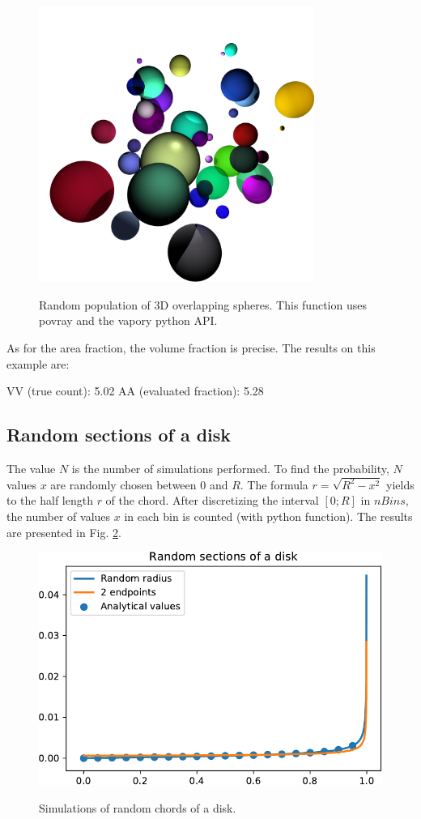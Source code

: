 \begin{figure}[htbp]
 \centering\caption{Random population of 3D overlapping spheres. This function uses povray and the vapory python API.}%
 \includegraphics[width=9cm]{spheres.png}%
 \label{fig:stereology:python:overlapping_spheres}%
\end{figure}

As for the area fraction, the volume fraction is precise. The results on this example are:

\begin{sh}
VV (true count): 5.02%
AA (evaluated fraction): 5.28%
\end{sh}


\subsection{Random sections of a disk}
The value $N$ is the number of simulations performed. 
To find the probability, $N$ values $x$ are randomly chosen between $0$ and $R$. The formula $r=\sqrt{R^2-x^2}$ yields to the half length $r$ of the chord. After discretizing the interval $[0;R]$ in $nBins$, the number of values $x$ in each bin is counted (with python  function). The results are presented in Fig. \ref{fig:stereology:python:disk}.

\begin{figure}[H]
 \centering\caption{Simulations of random chords of a disk.}%
 \includegraphics[width=.6\textwidth]{sections_disk-crop.pdf}%
 \label{fig:stereology:python:disk}%
\end{figure}

